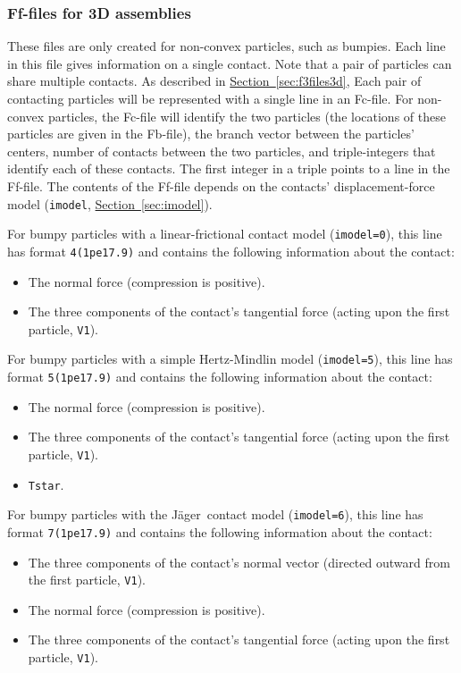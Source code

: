 \documentclass[letterpaper,11pt]{article}
\begin{document}
\subsubsection{Ff-files for 3D assemblies}\label{sec:f6files3d}
These files are only created for non-convex particles, such
as bumpies.
Each line in this file gives information on a single contact.
Note that a pair of particles can share multiple contacts.
As described in 
\hyperref[sec:f3files3d]{Section~\ref*{sec:f3files3d}},
Each pair of contacting particles will be represented with a 
single line in an Fc-file.
For non-convex particles, the Fc-file will identify the two particles
(the locations of these particles are given in the Fb-file), 
the branch vector between the particles' centers, 
number of contacts between the two particles,
and triple-integers that identify each of these contacts.
The first integer in a triple points to a line in the Ff-file.
The contents of the Ff-file depends on the contacts'
displacement-force model (\texttt{imodel}, 
\hyperref[sec:imodel]{Section~\ref*{sec:imodel}}).
%
\par
For bumpy particles with a linear-frictional contact
model (\texttt{imodel=0}), 
this line has format \texttt{4(1pe17.9)}
and contains the following information about the contact:
\begin{itemize}
\item
The normal force (compression is positive).
\item
The three components of the contact's tangential force
(acting upon the first particle, \texttt{V1}).
\end{itemize}
%
\par
For bumpy particles with a simple Hertz-Mindlin
model (\texttt{imodel=5}), 
this line has format \texttt{5(1pe17.9)}
and contains the following information about the contact:
\begin{itemize}
\item
The normal force (compression is positive).
\item
The three components of the contact's tangential force
(acting upon the first particle, \texttt{V1}).
\item
\texttt{Tstar}.
\end{itemize}
%
\par
For bumpy particles with the J\"{a}ger\ contact
model (\texttt{imodel=6}), 
this line has format \texttt{7(1pe17.9)}
and contains the following information about the contact:
\begin{itemize}
\item
The three components of the contact's normal vector (directed outward
from the first particle, \texttt{V1}).
\item
The normal force (compression is positive).
\item
The three components of the contact's tangential force
(acting upon the first particle, \texttt{V1}).
\end{itemize}
%
%
\end{document}
